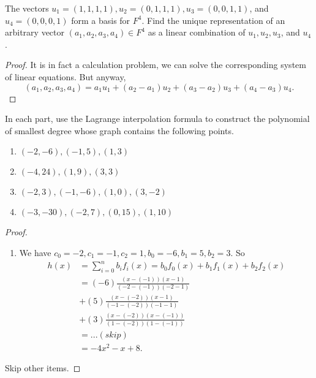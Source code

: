 \begin{exercise} \label{exercise 1.6.9}
The vectors \(u_1 = (1, 1, 1, 1), u_2 = (0, 1, 1, 1), u_3 = (0, 0, 1, 1)\), and \(u_4 = (0, 0, 0, 1)\) form a basis for \(F^4\).
Find the unique representation of an arbitrary vector \((a_1, a_2, a_3, a_4) \in F^4\) as a linear combination of \(u_1, u_2, u_3\), and \(u_4\).
\end{exercise}

\begin{proof}
It is in fact a calculation problem, we can solve the corresponding system of linear equations.
But anyway,
\[
    (a_1, a_2, a_3, a_4) = a_1 u_1 + (a_2 - a_1) u_2 + (a_3 - a_2) u_3 + (a_4 - a_3) u_4.
\]
\end{proof}

\begin{exercise} \label{exercise 1.6.10}
In each part, use the Lagrange interpolation formula to construct the polynomial of smallest degree whose graph contains the following points.
\begin{enumerate}
\item \((-2, -6), (-1 , 5), (1, 3)\)
\item \((-4, 24), (1, 9), (3, 3)\)
\item \((-2, 3), (-1, -6), (1, 0), (3, -2)\)
\item \((-3,-30), (-2, 7), (0, 15), (1, 10)\)
\end{enumerate}
\end{exercise}

\begin{proof}
\begin{enumerate}
\item We have \(c_0 = -2, c_1 = -1, c_2 = 1, b_0 = -6, b_1 = 5, b_2 = 3\).
    So \begin{align*}
        h(x) & = \sum_{i = 0}^n b_i f_i(x) = b_0 f_0(x) + b_1 f_1(x) + b_2 f_2(x) \\
             & = (-6) \frac{(x - (-1))(x - 1)}{(-2 - (-1))(-2 - 1)} \\
             & + (5) \frac{(x - (-2))(x - 1)}{(-1 - (-2))(-1 - 1)} \\
             & + (3) \frac{(x - (-2))(x - (-1))}{(1 - (-2))(1 - (-1))} \\
             & = ... (skip) \\
             & = -4x^2 - x + 8.
    \end{align*}
\end{enumerate}
Skip other items.
\end{proof}

